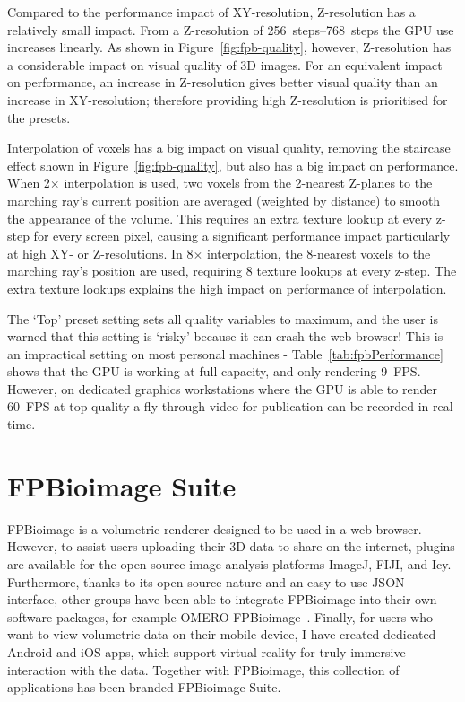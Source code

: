 Compared to the performance impact of XY-resolution, Z-resolution has a relatively small impact. 
From a Z-resolution of \SIrange{256}{768}{steps} the GPU use increases linearly. 
As shown in Figure~\ref{fig:fpb-quality}, however, Z-resolution has a considerable impact on visual quality of 3D images. 
For an equivalent impact on performance, an increase in Z-resolution gives better visual quality than an increase in XY-resolution; therefore providing high Z-resolution is prioritised for the presets. 

Interpolation of voxels has a big impact on visual quality, removing the staircase effect shown in Figure~\ref{fig:fpb-quality}, but also has a big impact on performance. 
When 2$\times$ interpolation is used, two voxels from the 2-nearest Z-planes to the marching ray's current position are averaged (weighted by distance) to smooth the appearance of the volume. 
This requires an extra texture lookup at every z-step for every screen pixel, causing a significant performance impact particularly at high XY- or Z-resolutions. 
In 8$\times$ interpolation, the 8-nearest voxels to the marching ray's position are used, requiring 8 texture lookups at every z-step. 
The extra texture lookups explains the high impact on performance of interpolation. 

The `Top' preset setting sets all quality variables to maximum, and the user is warned that this setting is `risky' because it can crash the web browser!
This is an impractical setting on most personal machines - Table~\ref{tab:fpbPerformance} shows that the GPU is working at full capacity, and only rendering \SI{9}{FPS}. 
However, on dedicated graphics workstations where the GPU is able to render \SI{60}{FPS} at top quality a fly-through video for publication can be recorded in real-time. 

\section{FPBioimage Suite}
FPBioimage is a volumetric renderer designed to be used in a web browser. 
However, to assist users uploading their 3D data to share on the internet, plugins are available for the open-source image analysis platforms ImageJ, FIJI, and Icy. 
Furthermore, thanks to its open-source nature and an easy-to-use JSON interface, other groups have been able to integrate FPBioimage into their own software packages, for example OMERO-FPBioimage~\cite{omero2018website}. 
Finally, for users who want to view volumetric data on their mobile device, I have created dedicated Android and iOS apps, which support virtual reality for truly immersive interaction with the data. %
Together with FPBioimage, this collection of applications has been branded FPBioimage Suite.


